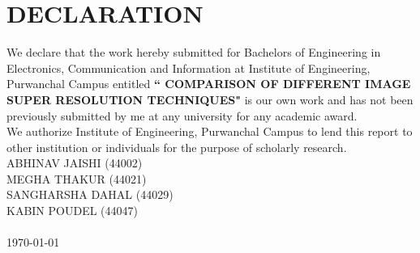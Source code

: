 \newpage
{}
\section*{DECLARATION}
We declare that the work hereby submitted for Bachelors of Engineering in Electronics, Communication and Information at Institute of Engineering, Purwanchal Campus entitled \textbf{`` COMPARISON OF DIFFERENT IMAGE SUPER RESOLUTION TECHNIQUES"} is our own work and has not been previously submitted by me at any university for any academic award.\\
We authorize Institute of Engineering, Purwanchal Campus to lend this report to other institution or individuals for the purpose of scholarly research.
\vspace{1cm}\\
ABHINAV JAISHI (44002)\\
MEGHA THAKUR (44021)\\
SANGHARSHA DAHAL (44029)\\
KABIN POUDEL (44047)\\
\\
\today